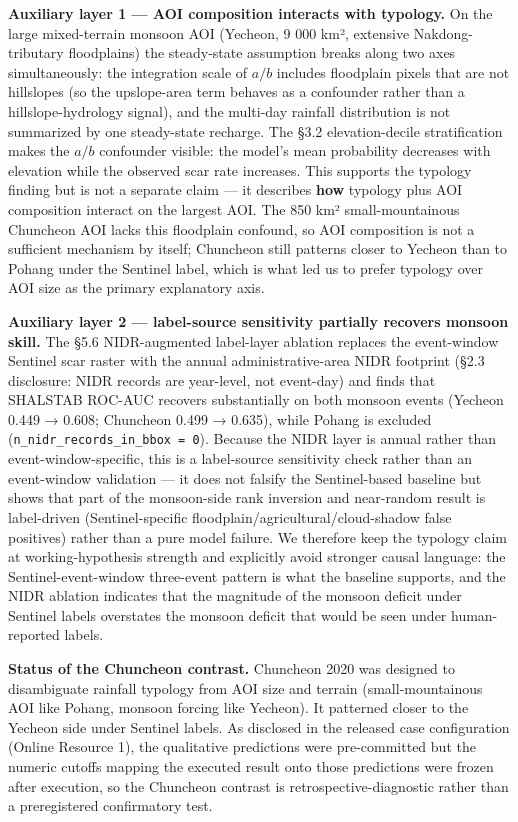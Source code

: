\documentclass[11pt,a4paper]{article}
\begin{document}
\textbf{Auxiliary layer 1 --- AOI composition interacts with typology.} On the large mixed-terrain monsoon AOI (Yecheon, 9 000 km², extensive Nakdong-tributary floodplains) the steady-state assumption breaks along two axes simultaneously: the integration scale of \(a/b\) includes floodplain pixels that are not hillslopes (so the upslope-area term behaves as a confounder rather than a hillslope-hydrology signal), and the multi-day rainfall distribution is not summarized by one steady-state recharge. The §3.2 elevation-decile stratification makes the \(a/b\) confounder visible: the model's mean probability decreases with elevation while the observed scar rate increases. This supports the typology finding but is not a separate claim --- it describes \textbf{how} typology plus AOI composition interact on the largest AOI. The 850 km² small-mountainous Chuncheon AOI lacks this floodplain confound, so AOI composition is not a sufficient mechanism by itself; Chuncheon still patterns closer to Yecheon than to Pohang under the Sentinel label, which is what led us to prefer typology over AOI size as the primary explanatory axis.

\textbf{Auxiliary layer 2 --- label-source sensitivity partially recovers monsoon skill.} The §5.6 NIDR-augmented label-layer ablation replaces the event-window Sentinel scar raster with the annual administrative-area NIDR footprint (§2.3 disclosure: NIDR records are year-level, not event-day) and finds that SHALSTAB ROC-AUC recovers substantially on both monsoon events (Yecheon 0.449 → 0.608; Chuncheon 0.499 → 0.635), while Pohang is excluded (\texttt{n\_nidr\_records\_in\_bbox\ =\ 0}). Because the NIDR layer is annual rather than event-window-specific, this is a label-source sensitivity check rather than an event-window validation --- it does not falsify the Sentinel-based baseline but shows that part of the monsoon-side rank inversion and near-random result is label-driven (Sentinel-specific floodplain/agricultural/cloud-shadow false positives) rather than a pure model failure. We therefore keep the typology claim at working-hypothesis strength and explicitly avoid stronger causal language: the Sentinel-event-window three-event pattern is what the baseline supports, and the NIDR ablation indicates that the magnitude of the monsoon deficit under Sentinel labels overstates the monsoon deficit that would be seen under human-reported labels.

\textbf{Status of the Chuncheon contrast.} Chuncheon 2020 was designed to disambiguate rainfall typology from AOI size and terrain (small-mountainous AOI like Pohang, monsoon forcing like Yecheon). It patterned closer to the Yecheon side under Sentinel labels. As disclosed in the released case configuration (Online Resource 1), the qualitative predictions were pre-committed but the numeric cutoffs mapping the executed result onto those predictions were frozen after execution, so the Chuncheon contrast is retrospective-diagnostic rather than a preregistered confirmatory test.
\end{document}
